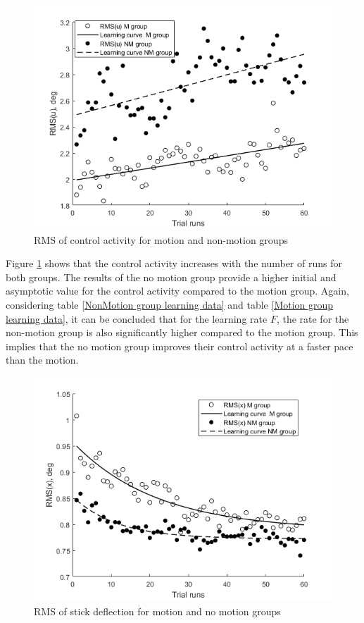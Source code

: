 \documentclass[conference]{IEEEtran}
\begin{document}
\begin{figure}[h!]
\centering
\includegraphics[width = \linewidth]{images/RMS_u.png}
\caption{RMS of control activity for motion and non-motion groups}
\label{fig:RMSu}
\end{figure}

Figure \ref{fig:RMSu} shows that the control activity increases with the number of runs for both groups. The results of the no motion group provide a higher initial and asymptotic value for the control activity compared to the motion group. Again, considering table \ref{NonMotion group learning data} and table \ref{Motion group learning data}, it can be concluded that for the learning rate $F$, the rate for the non-motion group is also significantly higher compared to the motion group. This implies that the no motion group improves their control activity at a faster pace than the motion.\\

\begin{figure}[h!]
\centering
\includegraphics[width = \linewidth]{images/RMS_x.png}
\caption{RMS of stick deflection for motion and no motion groups}
\label{fig:RMSx}
\end{figure}
\end{document}
